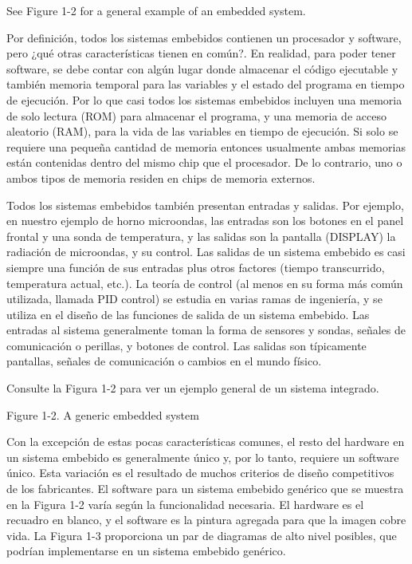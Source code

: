 \documentclass[output=paper, 
colorlinks,
citecolor=brown,
newtxmath
]{langscibook}
\begin{document}
See Figure 1-2 for a general example of an embedded system.

Por definición, todos los sistemas embebidos contienen un procesador y software, 
pero ¿qué otras características tienen en común?. En realidad, para poder tener software, 
se debe contar con algún lugar donde almacenar el código ejecutable y también
memoria temporal para las variables y el estado del programa en tiempo de ejecución. 
Por lo que casi todos los sistemas embebidos incluyen una memoria de solo lectura (ROM) 
para almacenar el programa, y una memoria de acceso aleatorio (RAM), para la vida
de las variables en tiempo de ejecución. Si solo se requiere una pequeña cantidad 
de memoria entonces usualmente ambas memorias están contenidas dentro del mismo chip que el procesador.
De lo contrario, uno o ambos tipos de memoria residen en chips de memoria externos.

Todos los sistemas embebidos también presentan entradas y salidas. Por ejemplo, 
en nuestro ejemplo de horno microondas, las entradas son los botones en el panel 
frontal y una sonda de temperatura, y las salidas son la pantalla (DISPLAY) 
la radiación de microondas, y su control. Las salidas de un sistema embebido es 
casi siempre una función de sus entradas plus otros factores (tiempo transcurrido, 
temperatura actual, etc.). La teoría de control (al menos en su forma
más común utilizada, llamada PID control)
se estudia en varias ramas de ingeniería, y se utiliza en el diseño de las 
funciones de salida de un sistema embebido. Las entradas al sistema generalmente toman 
la forma de sensores y sondas, señales de comunicación o perillas, y botones de control. 
Las salidas son típicamente pantallas, señales de comunicación o cambios en el mundo físico.

Consulte la Figura 1-2 para ver un ejemplo general de un sistema integrado.


Figure 1-2. A generic embedded system




Con la excepción de estas pocas características comunes, el resto del hardware en un sistema
embebido es generalmente único y, por lo tanto, requiere un software único. 
Esta variación es el resultado de muchos criterios de diseño competitivos de los fabricantes.
El software para un sistema embebido genérico que se muestra en la Figura 1-2 
varía según la funcionalidad necesaria. El hardware es el recuadro en blanco, 
y el software es la pintura agregada para que la imagen cobre vida. 
La Figura 1-3 proporciona un par de diagramas de alto nivel 
posibles, que podrían implementarse en un sistema embebido genérico.
\end{document}
